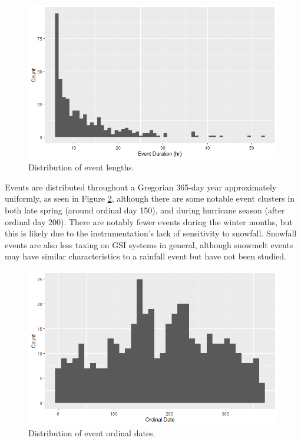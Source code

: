 \begin{figure}[ht]
	\centering
	\includegraphics[width=\textwidth]{gfx/chapter-data-analysis/hist_duration.png}
	\caption{Distribution of event lengths.}
	\label{fig:event-duration-histogram}
\end{figure}

Events are distributed throughout a Gregorian 365-day year approximately uniformly, as seen in Figure \ref{fig:event-date-histogram}, although there are some notable event clusters in both late spring (around ordinal day 150), and during hurricane season (after ordinal day 200).
There are notably fewer events during the winter months, but this is likely due to the instrumentation's lack of sensitivity to snowfall.
Snowfall events are also less taxing on GSI systems in general, although snowmelt events may have similar characteristics to a rainfall event but have not been studied.

\begin{figure}[ht]
	\centering
	\includegraphics[width=\textwidth]{gfx/chapter-data-analysis/hist_ordinal_date_event.png}
	\caption{Distribution of event ordinal dates.}
	\label{fig:event-date-histogram}
\end{figure}

